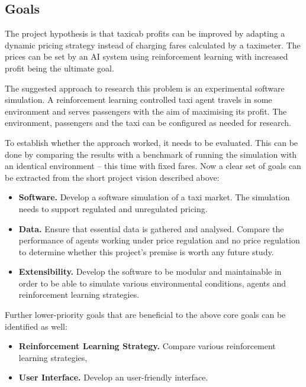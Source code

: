 \subsection{Goals}
\label{sec:intro:goals}

The project hypothesis is that taxicab profits can be improved by adapting a
dynamic pricing strategy instead of charging fares calculated by a taximeter.
The prices can be set by an AI system using reinforcement learning with
increased profit being the ultimate goal. 

The suggested approach to research this problem is an experimental software
simulation. A reinforcement learning controlled taxi agent travels in some
environment and serves passengers with the aim of maximising its profit. The
environment, passengers and the taxi can be configured as needed for research.

To establish whether the approach worked, it needs to be evaluated. This can be
done by comparing the results with a benchmark of running the simulation with an
identical environment -- this time with fixed fares.
Now a clear set of goals can be extracted from the short project vision
described above:

\begin{itemize}
  \item \textbf{Software.} Develop a software simulation of a taxi market. 
        The simulation needs to support regulated and unregulated pricing.
  \item \textbf{Data.} Ensure that essential data is gathered and analysed.
        Compare the performance of agents working under price regulation and no
        price regulation to determine whether this project's premise is worth
        any future study.
  \item \textbf{Extensibility.} Develop the software to be modular and
        maintainable in order to be able to simulate various environmental
        conditions, agents and reinforcement learning strategies.
\end{itemize}

Further lower-priority goals that are beneficial to the above core goals can be
identified as well:

\begin{itemize}
  \item \textbf{Reinforcement Learning Strategy.} Compare various reinforcement
        learning strategies,
  \item \textbf{User Interface.} Develop an user-friendly interface.
\end{itemize}
